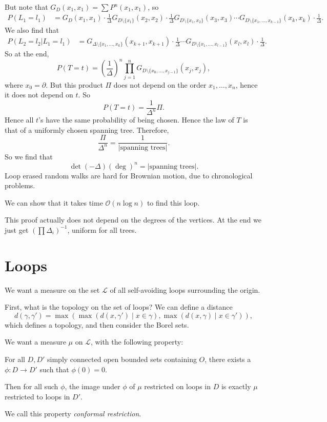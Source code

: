 \documentclass[12pt]{article}
\begin{document}
But note that $G_D(x_1, x_1) = \sum P^{n}(x_1, x_1)$, so
\begin{align*}
	P(L_1 = l_1) &= G_D(x_1, x_1) \cdot \frac{1}{\Delta} G_{D \setminus \{x_1\}} (x_2, x_2) \cdot \frac{1}{\Delta} G_{D \setminus \{x_1, x_2\}} (x_3, x_3) \cdots G_{D \setminus \{x_1, \ldots, x_{k-1}\}} (x_k, x_k) \cdot \frac{1}{\Delta}.
\end{align*}
We also find that
\begin{align*}
	P(L_2 = l_2 | L_1 = l_1) &= G_{\Delta \setminus \{x_1, \ldots, x_k\}}(x_{k+1}, x_{k+1}) \cdot \frac{1}{\Delta} \cdots G_{D \setminus \{x_1, \ldots, x_{l - 1}\}} (x_l, x_l) \cdot \frac{1}{\Delta}.
\end{align*}
So at the end,
\[
	P(T = t) = \left( \frac{1}{\Delta} \right)^{n} \prod_{j = 1}^{n} G_{D \setminus \{x_0, \ldots, x_{j-1}\}}(x_j, x_j),
\]
where $x_0 = \partial$. But this product $\Pi$ does not depend on the order $x_1, \ldots, x_n$, hence it does not depend on $t$. So
\[
P(T = t) = \frac{1}{\Delta^{n}} \Pi.
\]
Hence all $t$'s have the same probability of being chosen. Hence the law of $T$ is that of a uniformly chosen spanning tree. Therefore,
\[
	\frac{\Pi}{\Delta^{n}} = \frac{1}{|\text{spanning trees}|}.
\]
So we find that
\[
	\det( - \Delta) (\deg)^{n} = |\text{spanning trees}|.
\]
Loop erased random walks are hard for Brownian motion, due to chronological problems.

We can show that it takes time $\mathcal{O}(n \log n)$ to find this loop.

This proof actually does not depend on the degrees of the vertices. At the end we just get $(\prod \Delta_i)^{-1}$, uniform for all trees.


\newpage

\section{Loops}%
\label{sec:loop}

We want a measure on the set $\mathcal{L}$ of all self-avoiding loops surrounding the origin.

First, what is the topology on the set of loops? We can define a distance
\[
	d(\gamma, \gamma') = \max (\max(d(x, \gamma') \mid x \in \gamma), \max(d(x, \gamma) \mid x \in \gamma')),
\]
which defines a topology, and then consider the Borel sets.

We want a measure $\mu$ on $\mathcal{L}$, with the following property:
\begin{center}
	For all $D, D'$ simply connected open bounded sets containing $O$, there exists a $\phi : D \to D'$ such that $\phi(0) = 0$.

	Then for all such $\phi$, the image under $\phi$ of $\mu$ restricted on loops in $D$ is exactly $\mu$ restricted to loops in $D'$.
\end{center}
We call this property \emph{conformal restriction}.
\end{document}
